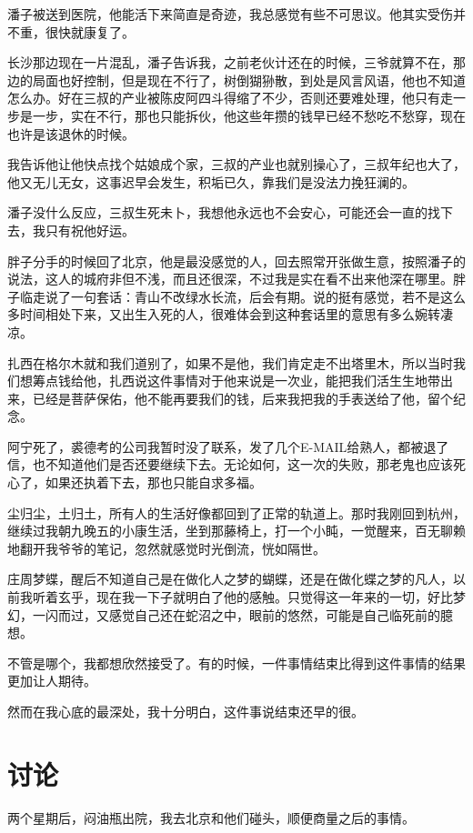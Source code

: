 潘子被送到医院，他能活下来简直是奇迹，我总感觉有些不可思议。他其实受伤并不重，很快就康复了。

长沙那边现在一片混乱，潘子告诉我，之前老伙计还在的时候，三爷就算不在，那边的局面也好控制，但是现在不行了，树倒猢狲散，到处是风言风语，他也不知道怎么办。好在三叔的产业被陈皮阿四斗得缩了不少，否则还要难处理，他只有走一步是一步，实在不行，那也只能拆伙，他这些年攒的钱早已经不愁吃不愁穿，现在也许是该退休的时候。

我告诉他让他快点找个姑娘成个家，三叔的产业也就别操心了，三叔年纪也大了，他又无儿无女，这事迟早会发生，积垢已久，靠我们是没法力挽狂澜的。

潘子没什么反应，三叔生死未卜，我想他永远也不会安心，可能还会一直的找下去，我只有祝他好运。

胖子分手的时候回了北京，他是最没感觉的人，回去照常开张做生意，按照潘子的说法，这人的城府非但不浅，而且还很深，不过我是实在看不出来他深在哪里。胖子临走说了一句套话：青山不改绿水长流，后会有期。说的挺有感觉，若不是这么多时间相处下来，又出生入死的人，很难体会到这种套话里的意思有多么婉转凄凉。

扎西在格尔木就和我们道别了，如果不是他，我们肯定走不出塔里木，所以当时我们想筹点钱给他，扎西说这件事情对于他来说是一次业，能把我们活生生地带出来，已经是菩萨保佑，他不能再要我们的钱，后来我把我的手表送给了他，留个纪念。

阿宁死了，裘德考的公司我暂时没了联系，发了几个E-MAIL给熟人，都被退了信，也不知道他们是否还要继续下去。无论如何，这一次的失败，那老鬼也应该死心了，如果还执着下去，那也只能自求多福。

尘归尘，土归土，所有人的生活好像都回到了正常的轨道上。那时我刚回到杭州，继续过我朝九晚五的小康生活，坐到那藤椅上，打一个小盹，一觉醒来，百无聊赖地翻开我爷爷的笔记，忽然就感觉时光倒流，恍如隔世。

庄周梦蝶，醒后不知道自己是在做化人之梦的蝴蝶，还是在做化蝶之梦的凡人，以前我听着玄乎，现在我一下子就明白了他的感触。只觉得这一年来的一切，好比梦幻，一闪而过，又感觉自己还在蛇沼之中，眼前的悠然，可能是自己临死前的臆想。

不管是哪个，我都想欣然接受了。有的时候，一件事情结束比得到这件事情的结果更加让人期待。

然而在我心底的最深处，我十分明白，这件事说结束还早的很。

\chapter{讨论}

两个星期后，闷油瓶出院，我去北京和他们碰头，顺便商量之后的事情。

